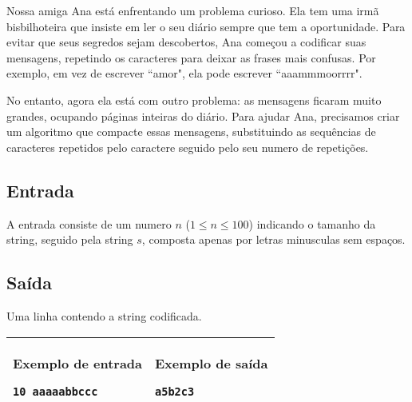 Nossa amiga Ana está enfrentando um problema curioso. Ela tem uma irmã bisbilhoteira que insiste em ler o seu diário sempre que tem a oportunidade. Para evitar que seus segredos sejam descobertos, Ana começou a codificar suas mensagens, repetindo os caracteres para deixar as frases mais confusas. Por exemplo, em vez de escrever ``amor", ela pode escrever ``aaammmoorrrr".

No entanto, agora ela está com outro problema: as mensagens ficaram muito grandes, ocupando páginas inteiras do diário. Para ajudar Ana, precisamos criar um algoritmo que compacte essas mensagens, substituindo as sequências de caracteres repetidos pelo caractere seguido pelo seu numero de repetições.
\subsection*{Entrada}

A entrada consiste de um numero $n$ ($1 \leq n \leq 100$) indicando o tamanho da string, seguido pela string $s$, composta apenas por letras minusculas sem espaços.

\subsection*{Saída}

Uma linha contendo a string codificada.

\begin{table}[!h]
\centering
\begin{tabular}{|l|l|}
\hline
\begin{minipage}[t]{3in}
\textbf{Exemplo de entrada}
\begin{verbatim}
10 aaaaabbccc
\end{verbatim}
\vspace{1mm}
\end{minipage}
&
\begin{minipage}[t]{3in}
\textbf{Exemplo de saída}
\begin{verbatim}
a5b2c3
\end{verbatim}
\vspace{1mm}
\end{minipage} \\
\hline
\end{tabular}
\end{table}

